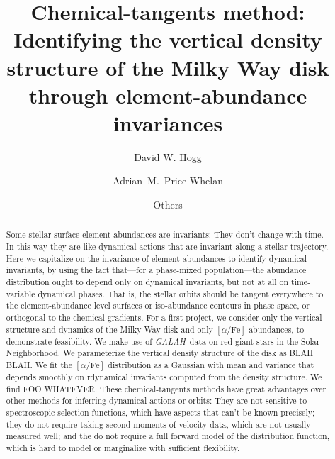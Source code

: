 \documentclass[modern]{aastex62}
\newcommand{\alphafe}{[\alpha/\mathrm{Fe}]}
\newcommand{\acronym}[1]{{\small{#1}}}
\newcommand{\project}[1]{\textsl{#1}}
\newcommand{\galah}{\project{\acronym{GALAH}}}
\begin{document}
\sloppy\sloppypar\raggedbottom\frenchspacing %
\graphicspath{ {figures/} }

\title{\textbf{Chemical-tangents method:\\
               Identifying the vertical density structure of the Milky Way disk
               through element-abundance invariances}}

\author[0000-0003-2866-9403]{David W. Hogg}

\author[0000-0003-0872-7098]{Adrian~M.~Price-Whelan}

\author{Others}

\begin{abstract}\noindent
Some stellar surface element abundances are invariants: They don't change with time.
In this way they are like dynamical actions that are invariant along a stellar trajectory.
Here we capitalize on the invariance of element abundances to identify dynamical
invariants, by using the fact that---for a phase-mixed population---the abundance
distribution ought to depend only on dynamical invariants, but not at all on time-variable
dynamical phases.
That is, the stellar orbits should be tangent everywhere to the
element-abundance level surfaces or iso-abundance contours in phase
space, or orthogonal to the chemical gradients.
For a first project, we consider only the vertical structure and dynamics of the Milky Way
disk and only $\alphafe$ abundances, to demonstrate feasibility.
We make use of \galah\ data on red-giant stars in the Solar Neighborhood.
We parameterize the vertical density structure of the disk as BLAH BLAH.
We fit the $\alphafe$ distribution as a Gaussian with mean and variance that depends
smoothly on rdynamical invariants computed from the density structure.
We find FOO WHATEVER.
These chemical-tangents methods have great advantages over other methods
for inferring dynamical actions or orbits: They are not sensitive to spectroscopic
selection functions, which have aspects that can't be known precisely; they
do not require taking second moments of velocity data, which are not usually measured
well; and the do not require a full forward model of the distribution function,
which is hard to model or marginalize with sufficient flexibility.
\end{abstract}
\end{document}
